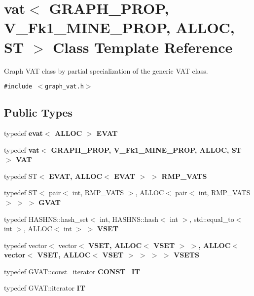 \section{vat$<$ GRAPH\_\-PROP, V\_\-Fk1\_\-MINE\_\-PROP, ALLOC, ST $>$ Class Template Reference}
\label{classvat_3_01GRAPH__PROP_00_01V__Fk1__MINE__PROP_00_01ALLOC_00_01ST_01_4}
Graph VAT class by partial specialization of the generic VAT class.  


{\tt \#include $<$graph\_\-vat.h$>$}

\subsection*{Public Types}
\begin{CompactItemize}
\item 
typedef \bf{evat}$<$ ALLOC $>$ \textbf{EVAT}\label{classvat_3_01GRAPH__PROP_00_01V__Fk1__MINE__PROP_00_01ALLOC_00_01ST_01_4_73929bd1bb81aa4ef7e70c484c76b8e5}

\item 
typedef \bf{vat}$<$ GRAPH\_\-PROP, V\_\-Fk1\_\-MINE\_\-PROP, ALLOC, ST $>$ \textbf{VAT}\label{classvat_3_01GRAPH__PROP_00_01V__Fk1__MINE__PROP_00_01ALLOC_00_01ST_01_4_30f7581749c43ea7b527c98732df4259}

\item 
typedef ST$<$ \bf{EVAT}, ALLOC$<$ \bf{EVAT} $>$ $>$ \textbf{RMP\_\-VATS}\label{classvat_3_01GRAPH__PROP_00_01V__Fk1__MINE__PROP_00_01ALLOC_00_01ST_01_4_7a05441ea912967a86c2cd98a58e7e15}

\item 
typedef ST$<$ pair$<$ int, RMP\_\-VATS $>$, ALLOC$<$ pair$<$ int, RMP\_\-VATS $>$ $>$ $>$ \bf{GVAT}
\item 
typedef HASHNS::hash\_\-set$<$ int, HASHNS::hash$<$ int $>$, std::equal\_\-to$<$ int $>$, ALLOC$<$ int $>$ $>$ \bf{VSET}
\item 
typedef vector$<$ vector$<$ \bf{VSET}, ALLOC$<$ \bf{VSET} $>$ $>$, ALLOC$<$ vector$<$ \bf{VSET}, ALLOC$<$ \bf{VSET} $>$ $>$ $>$ $>$ \bf{VSETS}
\item 
typedef GVAT::const\_\-iterator \textbf{CONST\_\-IT}\label{classvat_3_01GRAPH__PROP_00_01V__Fk1__MINE__PROP_00_01ALLOC_00_01ST_01_4_40bfc15f2c811986dd907ea4ca1d0e58}

\item 
typedef GVAT::iterator \textbf{IT}\label{classvat_3_01GRAPH__PROP_00_01V__Fk1__MINE__PROP_00_01ALLOC_00_01ST_01_4_d1446c9352a32b087d7dd66bef4c19c4}


\end{CompactItemize}
